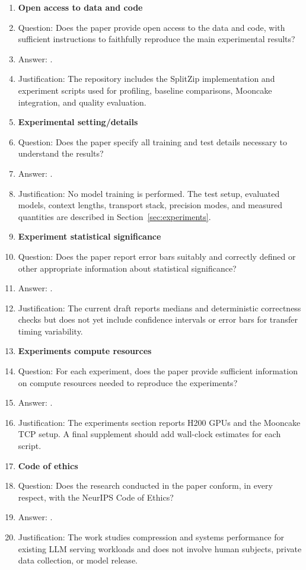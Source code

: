 \begin{enumerate}
\item {\bf Open access to data and code}
    \item[] Question: Does the paper provide open access to the data and code, with sufficient instructions to faithfully reproduce the main experimental results?
    \item[] Answer: \answerYes{}.
    \item[] Justification: The repository includes the SplitZip implementation and experiment scripts used for profiling, baseline comparisons, Mooncake integration, and quality evaluation.

\item {\bf Experimental setting/details}
    \item[] Question: Does the paper specify all training and test details necessary to understand the results?
    \item[] Answer: \answerYes{}.
    \item[] Justification: No model training is performed. The test setup, evaluated models, context lengths, transport stack, precision modes, and measured quantities are described in Section~\ref{sec:experiments}.

\item {\bf Experiment statistical significance}
    \item[] Question: Does the paper report error bars suitably and correctly defined or other appropriate information about statistical significance?
    \item[] Answer: \answerNo{}.
    \item[] Justification: The current draft reports medians and deterministic correctness checks but does not yet include confidence intervals or error bars for transfer timing variability.

\item {\bf Experiments compute resources}
    \item[] Question: For each experiment, does the paper provide sufficient information on compute resources needed to reproduce the experiments?
    \item[] Answer: \answerYes{}.
    \item[] Justification: The experiments section reports H200 GPUs and the Mooncake TCP setup. A final supplement should add wall-clock estimates for each script.

\item {\bf Code of ethics}
    \item[] Question: Does the research conducted in the paper conform, in every respect, with the NeurIPS Code of Ethics?
    \item[] Answer: \answerYes{}.
    \item[] Justification: The work studies compression and systems performance for existing LLM serving workloads and does not involve human subjects, private data collection, or model release.


\end{enumerate}
